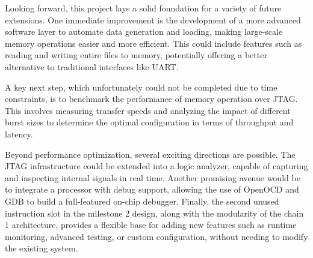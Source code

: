\documentclass[a4paper,11pt,oneside]{report}
\begin{document}
Looking forward, this project lays a solid foundation for a variety of future extensions.
One immediate improvement is the development of a more advanced software layer to automate data generation and loading, making large-scale memory operations easier and more efficient. 
This could include features such as reading and writing entire files to memory, potentially offering a better alternative to traditional interfaces like UART.

A key next step, which unfortunately could not be completed due to time constraints, is to benchmark the performance of memory operation over JTAG. 
This involves measuring transfer speeds and analyzing the impact of different burst sizes to determine the optimal configuration in terms of throughput and latency.

Beyond performance optimization, several exciting directions are possible.
The JTAG infrastructure could be extended into a logic analyzer, capable of capturing and inspecting internal signals in real time.
Another promising avenue would be to integrate a processor with debug support, allowing the use of OpenOCD and GDB to build a full-featured on-chip debugger.
Finally, the second unused instruction slot in the milestone 2 design, along with the modularity of the chain 1 architecture, provides a flexible base for adding new features such as runtime monitoring, 
advanced testing, or custom configuration, without needing to modify the existing system.

\cleardoublepage
{}
{}
\printbibliography

%
%
\end{document}
